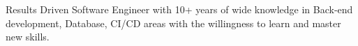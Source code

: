 
    Results Driven Software Engineer with 10+ years of wide knowledge in Back-end development, Database, CI/CD areas with the willingness to learn and master new skills.
